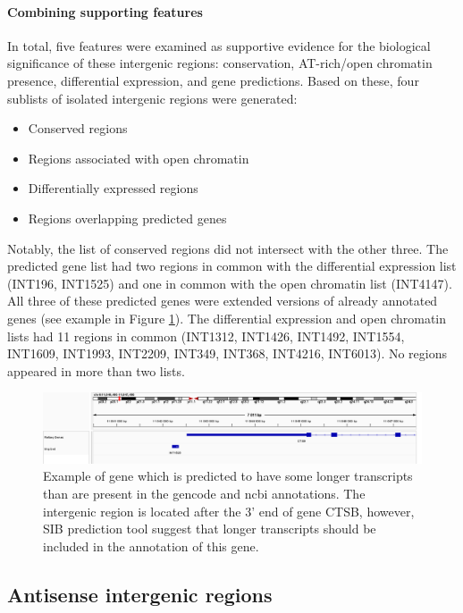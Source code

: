 \paragraph{Combining supporting features}

In total, five features were examined as supportive evidence for the biological significance of these intergenic regions:
conservation, AT-rich/open chromatin presence, differential expression, and gene predictions.
Based on these, four sublists of isolated intergenic regions were generated:

\begin{itemize}
  \item Conserved regions
  \item Regions associated with open chromatin
  \item Differentially expressed regions
  \item Regions overlapping predicted genes
\end{itemize}

Notably, the list of conserved regions did not intersect with the other three.
The predicted gene list had two regions in common with the differential expression list (INT196, INT1525)
and one in common with the open chromatin list (INT4147).
All three of these predicted genes were extended versions of already annotated genes (see example in Figure \ref{fig:predictedExtension}).
The differential expression and open chromatin lists had 11 regions in common
(INT1312, INT1426, INT1492, INT1554, INT1609, INT1993, INT2209, INT349, INT368, INT4216, INT6013).
No regions appeared in more than two lists.

\begin{figure}
  \centering
  \includegraphics[width=\linewidth]{images/igv/INT1525.png}
  \caption{Example of gene which is predicted to have some longer transcripts than are present in the gencode and ncbi annotations.
  The intergenic region is located after the 3' end of gene CTSB, however,
  SIB prediction tool suggest that longer transcripts should be included in the annotation of this gene.}
  \label{fig:predictedExtension}
\end{figure}

\subsection{Antisense intergenic regions}

